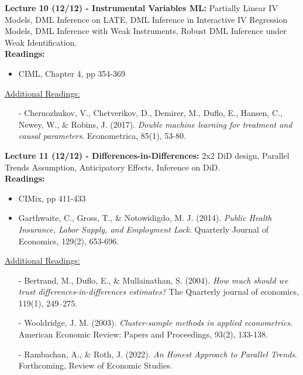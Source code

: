 \documentclass[12pt]{article}
\begin{document}
\textbf{Lecture 10 (12/12) - Instrumental Variables ML:} Partially Linear IV Models, DML Inference on LATE, DML Inference in Interactive IV Regression Models, DML Inference with Weak Instruments, Robust DML Inference under Weak Identification.\\
\textbf{Readings:}
\begin{itemize}
    \item CIML, Chapter 4, pp 354-369
\end{itemize}
\underline{Additional Readings:}
\begin{itemize}
    \item[-] Chernozhukov, V., Chetverikov, D., Demirer, M., Duflo, E., Hansen, C., Newey, W., \& Robins, J. (2017). \emph{Double machine learning for treatment and causal parameters}. Econometrica, 85(1), 53-80.
\end{itemize}

\textbf{Lecture 11 (12/12) - Differences-in-Differences:} 2x2 DiD design, Parallel Trends Assumption, Anticipatory Effects, Inference on DiD.\\
\textbf{Readings:}
\begin{itemize}
    \item CIMix, pp 411-433
    \item Garthwaite, C., Gross, T., \& Notowidigdo, M. J. (2014). \emph{Public Health Insurance, Labor Supply, and Employment Lock}. Quarterly Journal of Economics, 129(2), 653-696.
\end{itemize}
\underline{Additional Readings:}
\begin{itemize}
    \item[-] Bertrand, M., Duflo, E., \& Mullainathan, S. (2004). \emph{How much should we trust differences-in-differences estimates?} The Quarterly journal of economics, 119(1), 249–275.
    \item[-] Wooldridge, J. M. (2003). \emph{Cluster-sample methods in applied econometrics}. American Economic Review: Papers and Proceedings, 93(2), 133-138.
    \item[-] Rambachan, A., \& Roth, J. (2022). \emph{An Honest Approach to Parallel Trends}. Forthcoming, Review of Economic Studies.
\end{itemize}
\end{document}
